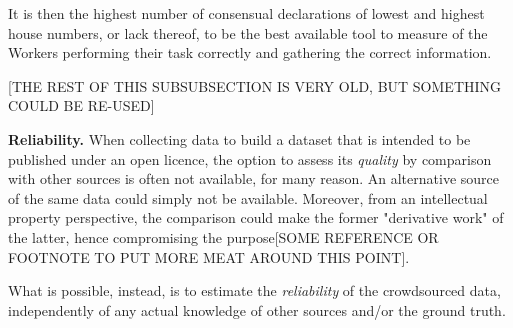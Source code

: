         It is then the highest number of consensual declarations of lowest and highest house numbers, or lack thereof, to be the best available tool to measure of the Workers performing their task correctly and gathering the correct information.  

        [THE REST OF THIS SUBSUBSECTION IS VERY OLD, BUT SOMETHING COULD BE RE-USED]

        \textbf{Reliability.} When collecting data to build a dataset that is intended to be published under an open licence, the option to assess its \textit{quality} by comparison with other sources is often not available, for many reason. An alternative source of the same data could simply not be available. Moreover, from an intellectual property perspective, the comparison could make the former "derivative work" of the latter, hence compromising the purpose{[}SOME REFERENCE OR FOOTNOTE TO PUT MORE MEAT AROUND THIS POINT{]}. 
        
        What is possible, instead, is to estimate the \textit{reliability} of the crowdsourced data, independently of any actual knowledge of other sources and/or the ground truth. 
        
